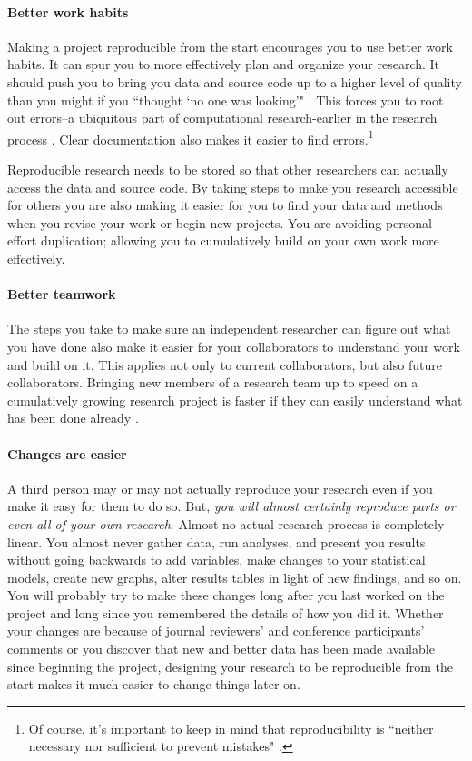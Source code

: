 \paragraph{Better work habits}
Making a project reproducible from the start encourages you to use better work habits. It can spur you to more effectively plan and organize your research. It should push you to bring you data and source code up to a higher level of quality than you might if you ``thought `no one was looking'" \cite[386]{Donoho2010}. This forces you to root out errors--a ubiquitous part of computational research-earlier in the research process \cite[385]{Donoho2010}. Clear documentation also makes it easier to find errors.\footnote{Of course, it's important to keep in mind that reproducibility is ``neither necessary nor sufficient to prevent mistakes" \cite[]{Stodden2009b}.}

Reproducible research needs to be stored so that other researchers can actually access the data and source code. By taking steps to make you research accessible for others you are also making it easier for you to find your data and methods when you revise your work or begin new projects. You are avoiding personal effort duplication; allowing you to cumulatively build on your own work more effectively.

\paragraph{Better teamwork}
The steps you take to make sure an independent researcher can figure out what you have done also make it easier for your collaborators to understand your work and build on it. This applies not only to current collaborators, but also future collaborators. Bringing new members of a research team up to speed on a cumulatively growing research project is faster if they can easily understand what has been done already \cite[386]{Donoho2010}. 

\paragraph{Changes are easier}
A third person may or may not actually reproduce your research even if you make it easy for them to do so. But, {\emph{you will almost certainly reproduce parts or even all of your own research}}. Almost no actual research process is completely linear. You almost never gather data, run analyses, and present you results without going backwards to add variables, make changes to your statistical models, create new graphs, alter results tables in light of new findings, and so on. You will probably try to make these changes long after you last worked on the project and long since you remembered the details of how you did it. Whether your changes are because of journal reviewers' and conference participants' comments or you discover that new and better data has been made available since beginning the project, designing your research to be reproducible from the start makes it much easier to change things later on.  

